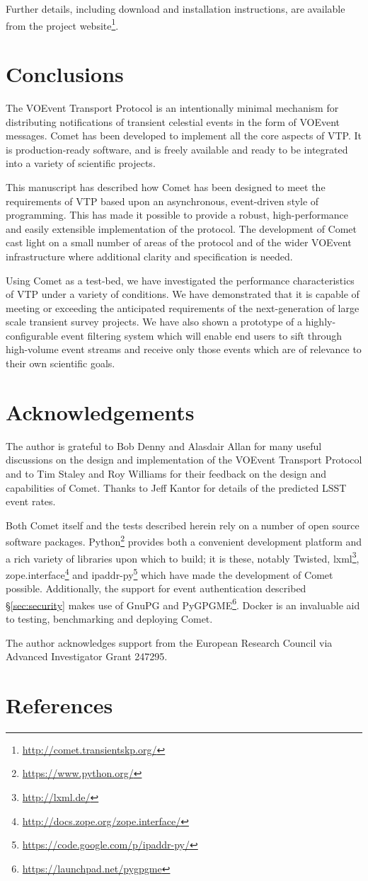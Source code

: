 \documentclass[5p,authoryear]{elsarticle}
\begin{document}
Further details, including download and installation instructions, are
available from the project
website\footnote{\url{http://comet.transientskp.org/}}.

\section{Conclusions}
\label{sec:conclusions}

The VOEvent Transport Protocol is an intentionally minimal mechanism for
distributing notifications of transient celestial events in the form of
VOEvent messages. Comet has been developed to implement all the core aspects
of VTP. It is production-ready software, and is freely available and ready to
be integrated into a variety of scientific projects.

This manuscript has described how Comet has been designed to meet the
requirements of VTP based upon an asynchronous, event-driven style of
programming. This has made it possible to provide a robust, high-performance
and easily extensible implementation of the protocol. The development of Comet
cast light on a small number of areas of the protocol and of the wider VOEvent
infrastructure where additional clarity and specification is needed.

Using Comet as a test-bed, we have investigated the performance characteristics
of VTP under a variety of conditions. We have demonstrated that it is capable
of meeting or exceeding the anticipated requirements of the next-generation of
large scale transient survey projects. We have also shown a prototype of a
highly-configurable event filtering system which will enable end users to
sift through high-volume event streams and receive only those events which are
of relevance to their own scientific goals.

\section{Acknowledgements}
\label{sec:ack}

The author is grateful to Bob Denny and Alasdair Allan for many useful
discussions on the design and implementation of the VOEvent Transport Protocol
and to Tim Staley and Roy Williams for their feedback on the design and
capabilities of Comet. Thanks to Jeff Kantor for details of the predicted LSST
event rates.

Both Comet itself and the tests described herein rely on a number
of open source software packages.
Python\footnote{\url{https://www.python.org/}} provides both a convenient
development platform and a rich variety of libraries upon which to build; it
is these, notably Twisted, lxml\footnote{\url{http://lxml.de/}},
zope.interface\footnote{\url{http://docs.zope.org/zope.interface/}} and
ipaddr-py\footnote{\url{https://code.google.com/p/ipaddr-py/}} which have made
the development of Comet possible. Additionally, the support for event
authentication described \S\ref{sec:security} makes use of GnuPG and
PyGPGME\footnote{\url{https://launchpad.net/pygpgme}}. Docker is an invaluable
aid to testing, benchmarking and deploying Comet.

The author acknowledges support from the European Research Council via
Advanced Investigator Grant 247295.

\section*{References}



\end{document}
